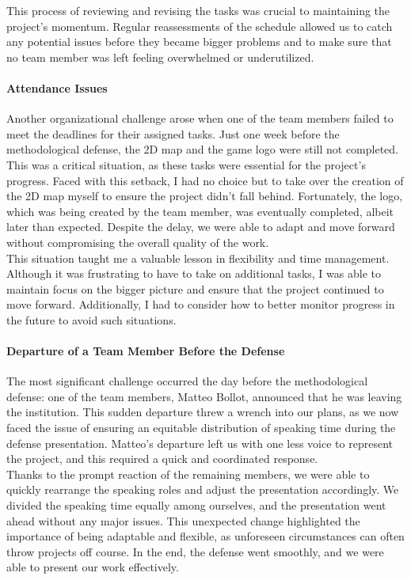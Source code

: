 \documentclass{article}
\begin{document}
This process of reviewing and revising the tasks was crucial to maintaining the project’s momentum. Regular reassessments of the schedule allowed us to catch any potential issues before they became bigger problems and to make sure that no team member was left feeling overwhelmed or underutilized.

\paragraph{Attendance Issues}\hfill

Another organizational challenge arose when one of the team members failed to meet the deadlines for their assigned tasks. Just one week before the methodological defense, the 2D map and the game logo were still not completed. This was a critical situation, as these tasks were essential for the project’s progress. Faced with this setback, I had no choice but to take over the creation of the 2D map myself to ensure the project didn’t fall behind. Fortunately, the logo, which was being created by the team member, was eventually completed, albeit later than expected. Despite the delay, we were able to adapt and move forward without compromising the overall quality of the work.\\

This situation taught me a valuable lesson in flexibility and time management. Although it was frustrating to have to take on additional tasks, I was able to maintain focus on the bigger picture and ensure that the project continued to move forward. Additionally, I had to consider how to better monitor progress in the future to avoid such situations.

\paragraph{Departure of a Team Member Before the Defense}\hfill

The most significant challenge occurred the day before the methodological defense: one of the team members, Matteo Bollot, announced that he was leaving the institution. This sudden departure threw a wrench into our plans, as we now faced the issue of ensuring an equitable distribution of speaking time during the defense presentation. Matteo’s departure left us with one less voice to represent the project, and this required a quick and coordinated response.\\

Thanks to the prompt reaction of the remaining members, we were able to quickly rearrange the speaking roles and adjust the presentation accordingly. We divided the speaking time equally among ourselves, and the presentation went ahead without any major issues. This unexpected change highlighted the importance of being adaptable and flexible, as unforeseen circumstances can often throw projects off course. In the end, the defense went smoothly, and we were able to present our work effectively.\\
\end{document}
